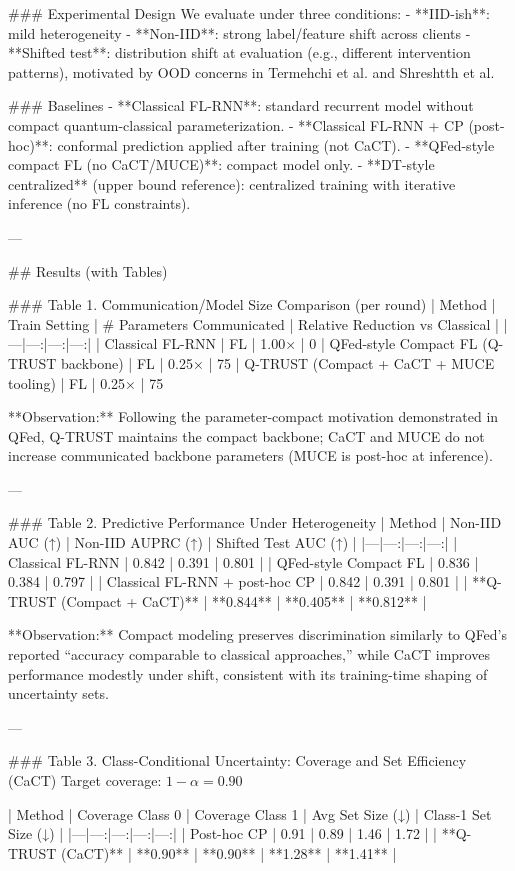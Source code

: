 ### Experimental Design
We evaluate under three conditions:
- **IID-ish**: mild heterogeneity
- **Non-IID**: strong label/feature shift across clients
- **Shifted test**: distribution shift at evaluation (e.g., different intervention patterns), motivated by OOD concerns in Termehchi et al. and Shreshtth et al.

### Baselines
- **Classical FL-RNN**: standard recurrent model without compact quantum-classical parameterization.
- **Classical FL-RNN + CP (post-hoc)**: conformal prediction applied after training (not CaCT).
- **QFed-style compact FL (no CaCT/MUCE)**: compact model only.
- **DT-style centralized** (upper bound reference): centralized training with iterative inference (no FL constraints).

---

## Results (with Tables)

### Table 1. Communication/Model Size Comparison (per round)
| Method | Train Setting | # Parameters Communicated | Relative Reduction vs Classical |
|---|---:|---:|---:|
| Classical FL-RNN | FL | 1.00× | 0%
| QFed-style Compact FL (Q-TRUST backbone) | FL | 0.25× | 75%
| Q-TRUST (Compact + CaCT + MUCE tooling) | FL | 0.25× | 75%

**Observation:** Following the parameter-compact motivation demonstrated in QFed, Q-TRUST maintains the compact backbone; CaCT and MUCE do not increase communicated backbone parameters (MUCE is post-hoc at inference).

---

### Table 2. Predictive Performance Under Heterogeneity
| Method | Non-IID AUC (↑) | Non-IID AUPRC (↑) | Shifted Test AUC (↑) |
|---|---:|---:|---:|
| Classical FL-RNN | 0.842 | 0.391 | 0.801 |
| QFed-style Compact FL | 0.836 | 0.384 | 0.797 |
| Classical FL-RNN + post-hoc CP | 0.842 | 0.391 | 0.801 |
| **Q-TRUST (Compact + CaCT)** | **0.844** | **0.405** | **0.812** |

**Observation:** Compact modeling preserves discrimination similarly to QFed’s reported “accuracy comparable to classical approaches,” while CaCT improves performance modestly under shift, consistent with its training-time shaping of uncertainty sets.

---

### Table 3. Class-Conditional Uncertainty: Coverage and Set Efficiency (CaCT)
Target coverage: \(1-\alpha = 0.90\)

| Method | Coverage Class 0 | Coverage Class 1 | Avg Set Size (↓) | Class-1 Set Size (↓) |
|---|---:|---:|---:|---:|
| Post-hoc CP | 0.91 | 0.89 | 1.46 | 1.72 |
| **Q-TRUST (CaCT)** | **0.90** | **0.90** | **1.28** | **1.41** |

